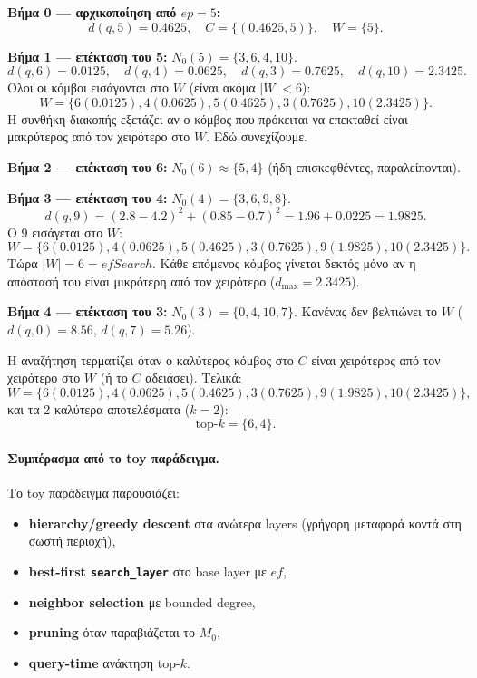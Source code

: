 \documentclass[12pt,a4paper]{article}
\begin{document}
\textbf{Βήμα 0 — αρχικοποίηση από $ep=5$:}
\[
d(q,5)=0.4625,\quad C=\{(0.4625,5)\},\quad W=\{5\}.
\]

\textbf{Βήμα 1 — επέκταση του 5:} $N_0(5)=\{3,6,4,10\}$.
\[
d(q,6)=0.0125,\quad d(q,4)=0.0625,\quad d(q,3)=0.7625,\quad d(q,10)=2.3425.
\]
Όλοι οι κόμβοι εισάγονται στο $W$ (είναι ακόμα $|W|<6$):
\[
W=\{6(0.0125),4(0.0625),5(0.4625),3(0.7625),10(2.3425)\}.
\]
Η συνθήκη διακοπής εξετάζει αν ο κόμβος που πρόκειται να επεκταθεί είναι μακρύτερος από τον χειρότερο στο $W$. Εδώ συνεχίζουμε.

\textbf{Βήμα 2 — επέκταση του 6:} $N_0(6) \approx \{5,4\}$ (ήδη επισκεφθέντες, παραλείπονται).

\textbf{Βήμα 3 — επέκταση του 4:} $N_0(4)=\{3,6,9,8\}$.
\[
d(q,9)=(2.8-4.2)^2+(0.85-0.7)^2=1.96+0.0225=1.9825.
\]
Ο 9 εισάγεται στο $W$:
\[
W=\{6(0.0125),4(0.0625),5(0.4625),3(0.7625),9(1.9825),10(2.3425)\}.
\]
Τώρα $|W|=6=efSearch$. Κάθε επόμενος κόμβος γίνεται δεκτός μόνο αν η απόστασή του είναι μικρότερη από τον χειρότερο ($d_{\max}=2.3425$).

\textbf{Βήμα 4 — επέκταση του 3:} $N_0(3)=\{0,4,10,7\}$. Κανένας δεν βελτιώνει το $W$ ($d(q,0)=8.56$, $d(q,7)=5.26$).

Η αναζήτηση τερματίζει όταν ο καλύτερος κόμβος στο $C$ είναι χειρότερος από τον χειρότερο στο $W$ (ή το $C$ αδειάσει). Τελικά:
\[
W=\{6(0.0125),4(0.0625),5(0.4625),3(0.7625),9(1.9825),10(2.3425)\},
\]
και τα 2 καλύτερα αποτελέσματα ($k=2$):
\[
\text{top-}k=\{6,4\}.
\]

\paragraph{Συμπέρασμα από το toy παράδειγμα.}
Το toy παράδειγμα παρουσιάζει:
\begin{itemize}
    \item \textbf{hierarchy/greedy descent} στα ανώτερα layers (γρήγορη μεταφορά κοντά στη σωστή περιοχή),
    \item \textbf{best-first \texttt{search\_layer}} στο base layer με $ef$,
    \item \textbf{neighbor selection} με bounded degree,
    \item \textbf{pruning} όταν παραβιάζεται το $M_0$,
    \item \textbf{query-time} ανάκτηση top-$k$.
\end{itemize}
\end{document}
